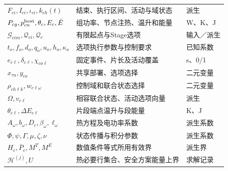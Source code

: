 \begin{longtable}{@{}p{5.3cm}p{6.0cm}>{\raggedright\arraybackslash}p{2.5cm}@{}}
$F_{ci},I_{ci},\iota_{ci},k_{ch}(t)$ & 结束、执行区间、活动与域状态 & 派生 \\
$P_{cg},p^{\rm heat}_{cn},\theta_c,E_c,\bar E$ & 组功率、节点注热、温升和能量 & W、K、J \\
\midrule
$\mathcal G_{cim},\mathcal Q_{ci},\mathcal Q_c$ & 有限起点与Stage选项 & 输入／派生 \\
$t_o,f_o,d_o,q_o,u_o,h_o,\kappa_o$ & 选项执行参数与控制要求 & 已知系数 \\
$e_{c\ell},\delta_{c\ell},\chi_{co\ell}$ & 固定事件、片长及活动覆盖 & s、0/1 \\
$x_{\tau u},y_{co}$ & 共享部署、选项选择 & 二元变量 \\
$\rho_{ch\ell k},w_{c\ell\omega}$ & 控制域和联合状态选择 & 二元变量 \\
$\Omega,v_{c\ell}$ & 相容联合状态、活动选项向量 & 派生 \\
$\theta_{c\ell},\Delta E_{c\ell}$ & 片段端点温升与段能量 & K、J \\
$A_\omega,b_\omega,D_c,\beta_\omega,\ell_\omega$ & 热方程及电功率系数 & 派生系数 \\
$\Phi,\psi,\Gamma,\mu,\zeta,\nu$ & 状态传播与积分参数 & 派生系数 \\
$H_c,\overline P_c,M^T,M^E$ & 数值条件等式所用有效界 & 派生界 \\
$\mathcal H^{(j)},U$ & 热必要行集合、安全方案能量上界 & 求解记录 \\
\bottomrule
\end{longtable}
